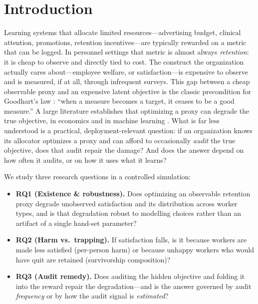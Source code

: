 \documentclass[11pt]{article}
\begin{document}
\section{Introduction}
Learning systems that allocate limited resources---advertising budget, clinical
attention, promotions, retention incentives---are typically rewarded on a
metric that can be logged. In personnel settings that metric is almost always
\emph{retention}: it is cheap to observe and directly tied to cost. The
construct the organization actually cares about---employee welfare, or
satisfaction---is expensive to observe and is measured, if at all, through
infrequent surveys. This gap between a cheap observable proxy and an expensive
latent objective is the classic precondition for Goodhart's law
\citep{strathern1997}: ``when a measure becomes a target, it ceases to be a
good measure.'' A large literature establishes that optimizing a proxy can
degrade the true objective, in economics \citep{holmstrom1991,baker1992} and in
machine learning \citep{amodei2016,krakovna2020,skalse2022,karwowski2024}. What
is far less understood is a practical, deployment-relevant question: if an
organization knows its allocator optimizes a proxy and can afford to
occasionally \emph{audit} the true objective, does that audit repair the damage?
And does the answer depend on how often it audits, or on how it uses what it
learns?

We study three research questions in a controlled simulation:
\begin{itemize}
  \item \textbf{RQ1 (Existence \& robustness).} Does optimizing an observable
  retention proxy degrade unobserved satisfaction and its distribution across
  worker types, and is that degradation robust to modelling choices rather than
  an artifact of a single hand-set parameter?
  \item \textbf{RQ2 (Harm vs.\ trapping).} If satisfaction falls, is it because
  workers are made less satisfied (per-person harm) or because unhappy workers
  who would have quit are retained (survivorship composition)?
  \item \textbf{RQ3 (Audit remedy).} Does auditing the hidden objective and
  folding it into the reward repair the degradation---and is the answer governed
  by audit \emph{frequency} or by how the audit signal is \emph{estimated}?
\end{itemize}
\end{document}
